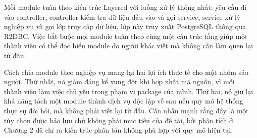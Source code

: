 \documentclass[12pt,a4paper,oneside]{report}
\begin{document}
Mỗi module tuân theo kiến trúc Layered với luồng xử lý thống nhất: yêu cầu đi vào controller, controller kiểm tra dữ liệu đầu vào và gọi service, service xử lý nghiệp vụ và gọi lớp truy cập dữ liệu, lớp này truy xuất PostgreSQL thông qua R2DBC. Việc bắt buộc mọi module tuân theo cùng một cấu trúc tầng giúp một thành viên có thể đọc hiểu module do người khác viết mà không cần làm quen lại từ đầu.

Cách chia module theo nghiệp vụ mang lại hai lợi ích thực tế cho một nhóm sáu người. Thứ nhất, nó giảm đáng kể xung đột khi hợp nhất mã nguồn, vì mỗi thành viên làm việc chủ yếu trong phạm vi package của mình. Thứ hai, nó giữ lại khả năng tách một module thành dịch vụ độc lập về sau nếu quy mô hệ thống thực sự đòi hỏi, mà không phải viết lại từ đầu. Cần nhấn mạnh rằng đây là một tùy chọn được bảo lưu chứ không phải mục tiêu của đề tài, bởi phân tích ở Chương 2 đã chỉ ra kiến trúc phân tán không phù hợp với quy mô hiện tại.
\end{document}
